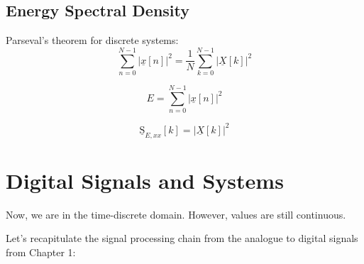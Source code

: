 \begin{refsection}
\subsection{Energy Spectral Density}


Parseval's theorem for discrete systems:
\begin{equation}
	\sum\limits_{n=0}^{N-1} \left|\underline{x}[n]\right|^2 = \frac{1}{N} \sum\limits_{k=0}^{N-1} \left|\underline{X}[k]\right|^2
\end{equation}

\begin{equation}
	E = \sum\limits_{n=0}^{N-1} \left|\underline{x}[n]\right|^2
\end{equation}

\begin{equation}
	\underline{\mathrm{S}}_{E,xx}[k] = \left|\underline{X}[k]\right|^2
\end{equation}



\section{Digital Signals and Systems}

Now, we are in the time-discrete domain. However, values are still continuous.

Let's recapitulate the signal processing chain from the analogue to digital signals from Chapter 1:
\begin{figure}[H]
	\centering
	\begin{adjustbox}{scale=0.8}
\end{adjustbox}
\end{figure}
\end{refsection}
